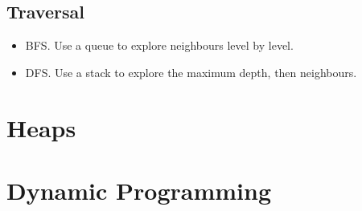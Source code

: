 \documentclass[10pt,landscape,a4paper]{article}
\begin{document}
\begin{multicols*}{4}
\subsection{Traversal}
\begin{itemize}
    \item BFS. Use a queue to explore neighbours level by level.
    \item DFS. Use a stack to explore the maximum depth, then neighbours.
\end{itemize}



\section{Heaps}

\section{Dynamic Programming}
\end{multicols*}
\end{document}
